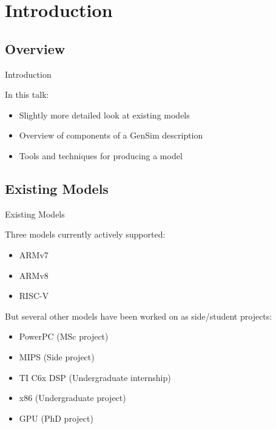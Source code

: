 \section{Introduction}
\subsection{Overview}
\begin{frame}{Introduction}

In this talk:
\begin{itemize}
\item Slightly more detailed look at existing models
\item Overview of components of a GenSim description
\item Tools and techniques for producing a model
\end{itemize}

\end{frame}

\begin{frame}
	\tableofcontents
\end{frame}	

\subsection{Existing Models}

\begin{frame}{Existing Models}

Three models currently actively supported:

\begin{itemize}
\item ARMv7
\item ARMv8
\item RISC-V

\end{itemize}

\pause

But several other models have been worked on as side/student projects:

\begin{itemize}
\item PowerPC (MSc project)
\item MIPS (Side project)
\item TI C6x DSP (Undergraduate internship)
\item x86 (Undergraduate project)
\item GPU (PhD project)
\end{itemize}
\end{frame}

